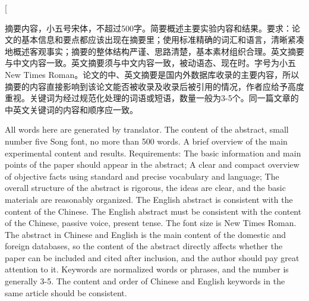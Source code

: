 \documentclass{thuemp}
\begin{document}



\twocolumn[
\begin{@twocolumnfalse}
\maketitle

\begin{empAbstract}
摘要内容，小五号宋体，不超过500字。简要概述主要实验内容和结果。要求：论文的基本信息和要点都应该出现在摘要里；使用标准精确的词汇和语言，清晰紧凑地概述客观事实；摘要的整体结构严谨、思路清楚，基本素材组织合理。英文摘要与中文内容一致。英文摘要须与中文内容一致，被动语态、现在时。字号为小五New Times Roman。论文的中、英文摘要是国内外数据库收录的主要内容，所以摘要的内容直接影响到该论文能否被收录及收录后被引用的情况，作者应给予高度重视。关键词为经过规范化处理的词语或短语，数量一般为3-5个。同一篇文章的中英文关键词的内容和顺序应一致。
\end{empAbstract}


\begin{empAbstractEn}
All words here are generated by translator. The content of the abstract, small number five Song font, no more than 500 words. A brief overview of the main experimental content and results. Requirements: The basic information and main points of the paper should appear in the abstract; A clear and compact overview of objective facts using standard and precise vocabulary and language; The overall structure of the abstract is rigorous, the ideas are clear, and the basic materials are reasonably organized. The English abstract is consistent with the content of the Chinese. The English abstract must be consistent with the content of the Chinese, passive voice, present tense. The font size is New Times Roman. The abstract in Chinese and English is the main content of the domestic and foreign databases, so the content of the abstract directly affects whether the paper can be included and cited after inclusion, and the author should pay great attention to it. Keywords are normalized words or phrases, and the number is generally 3-5. The content and order of Chinese and English keywords in the same article should be consistent.
\end{empAbstractEn}

\end{@twocolumnfalse}
\end{document}

